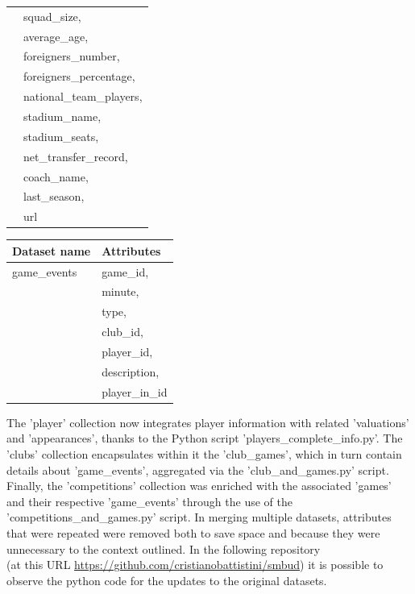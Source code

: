 \documentclass{Configuration_Files/PoliMi3i_thesis}
\begin{document}
\begin{tabular}{|l|p{13cm}|}
    & squad\_size,                              \\
    & average\_age,                             \\
    & foreigners\_number,                       \\
    & foreigners\_percentage,                   \\
    & national\_team\_players,                  \\
    & stadium\_name,                            \\
    & stadium\_seats,                           \\
    & net\_transfer\_record,                    \\
    & coach\_name,                              \\
    & last\_season,                             \\
    & url                                       \\
\hline
\end{tabular}

\begin{tabular}{|l|p{13cm}|}
	\hline
  \rowcolor{bluepoli!40}
	\textbf{Dataset name} & \textbf{Attributes}                       \\
	\hline
    game\_events
    & game\_id,                                 \\
    & minute,                                   \\
    & type,                                     \\
    & club\_id,                                 \\
    & player\_id,                               \\
    & description,                              \\
    & player\_in\_id                            \\
\hline
\end{tabular}

The 'player' collection now integrates player information with related 'valuations' and 'appearances', thanks to the Python script 'players\_complete\_info.py'. The 'clubs' collection encapsulates within it the 'club\_games', which in turn contain details about 'game\_events', aggregated via the 'club\_and\_games.py' script. Finally, the 'competitions' collection was enriched with the associated 'games' and their respective 'game\_events' through the use of the 'competitions\_and\_games.py' script.
In merging multiple datasets, attributes that were repeated were removed both to save space and because they were unnecessary to the context outlined.
In the following repository \\
(at this URL \url{https://github.com/cristianobattistini/smbud}) it is possible to observe the python code for the updates to the original datasets.
\end{document}
